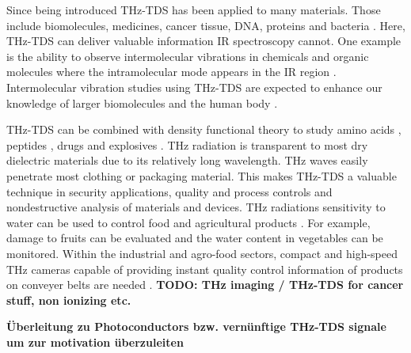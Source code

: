 Since being introduced THz-TDS has been applied to many materials. Those include biomolecules, medicines, cancer tissue, DNA, proteins and bacteria \cite{chenLargeOxidationDependence2005,waltherNoncovalentIntermolecularForces2003,fischerTerahertzTimedomainSpectroscopy2005}. Here, THz-TDS can deliver valuable information IR spectroscopy cannot. One example is the ability to observe intermolecular vibrations in chemicals and organic molecules where the intramolecular mode appears in the IR region \cite{nagaiDirectEvidenceIntermolecular2005}. Intermolecular vibration studies using THz-TDS are expected to enhance our knowledge of larger biomolecules and the human body \cite{tonouchiCuttingedgeTerahertzTechnology2007}. 

THz-TDS can be combined with density functional theory \cite{chenCombinationTerahertzSpectroscopy2022} to study amino acids \cite{liaoAminoacidClassificationBased2023}, peptides \cite{neuTerahertzSpectroscopyTetrameric2019}, drugs \cite{kawaseNondestructiveTerahertzImaging2003} and explosives \cite{daviesTerahertzSpectroscopyExplosives2008}. THz radiation is transparent to most dry dielectric materials due to its relatively long wavelength. THz waves easily penetrate most clothing \cite{prokschaTerahertzInsightsFabric2024} or packaging \cite{wietzkeTerahertzSpectroscopyPolymers2011} material. This makes THz-TDS a valuable technique in security applications, quality and process controls and nondestructive analysis of materials and devices. THz radiations sensitivity to water can be used to control food and agricultural products \cite{afsah-hejriTerahertzSpectroscopyImaging2020}. For example, damage to fruits can be evaluated and the water content in vegetables can be monitored. Within the industrial and agro-food sectors, compact and high-speed THz cameras capable of providing instant quality control information of products on conveyer belts are needed \cite{THzSecurityApplications}. \textbf{TODO: THz imaging / THz-TDS for cancer stuff, non ionizing etc.}

\textbf{Überleitung zu Photoconductors bzw. vernünftige THz-TDS signale um zur motivation überzuleiten}







